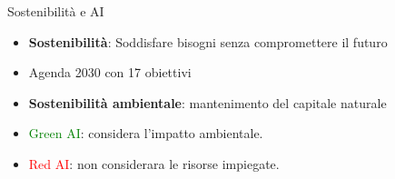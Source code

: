 \begin{frame}{Sostenibilità e AI} 
        \begin{itemize}
                \item \textbf{Sostenibilità}: Soddisfare bisogni senza compromettere il futuro
                \item Agenda 2030 con 17 obiettivi
                \item \textbf{Sostenibilità ambientale}: mantenimento del capitale naturale
                \item \textcolor{green}{Green AI}: considera l'impatto ambientale.
                \item \textcolor{red}{Red AI}: non considerara le risorse impiegate.
        \end{itemize}
\end{frame}
